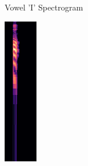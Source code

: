 \begin{figure}[htbp]
\begin{subfigure}[b]{0.19\textwidth}
        \caption{Vowel 'I' Spectrogram}
        \label{fig:vowel_i_spec}
    \end{subfigure}
    \hfill
    \begin{subfigure}[b]{0.19\textwidth}
        \includegraphics[width=\textwidth]{res/images/model/O.png}

\end{subfigure}
\end{figure}
